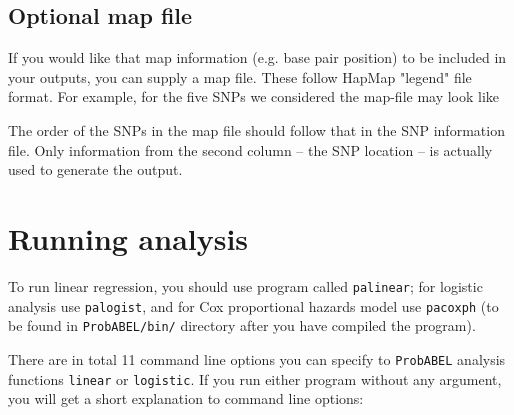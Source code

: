 \documentclass[12pt,a4paper]{article}
\begin{document}
\subsection{Optional map file}
If you would like that map information (e.g. base pair position) to 
be included in your outputs, you can supply a map file. These follow 
HapMap "legend" file format. For example, for the five SNPs we considered 
the map-file may look like



The order of the SNPs in the map file should follow that in the SNP information 
file. Only information from the second column -- the SNP location -- is 
actually used to generate the output.

\section{Running analysis}

To run linear regression, you should use program called \texttt{palinear};
for logistic analysis use \texttt{palogist}, and for Cox proportional 
hazards model use \texttt{pacoxph} (to be found in 
\texttt{ProbABEL/bin/} directory after you have compiled the program).

There are in total 11 command line options you can specify to \texttt{ProbABEL} 
analysis functions \texttt{linear} or \texttt{logistic}. If you run 
either program without any argument, you 
will get a short explanation to command line options:
\end{document}
